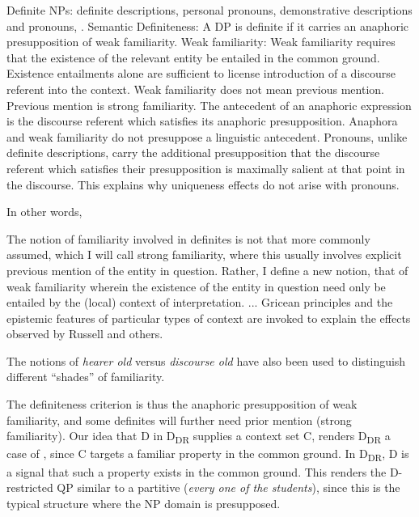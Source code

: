\documentclass[output=paper,
modfonts
]{langscibook}
\begin{document}
\ea\label{ex:etxeberria:23}
	\ea
		{ Definite NPs:} definite descriptions, personal pronouns, demonstrative descriptions and pronouns, .
	\ex
		{Semantic Definiteness:} A DP is definite if it carries an anaphoric presupposition of weak familiarity.
	\ex
		{Weak familiarity:}  Weak familiarity requires that the existence of the relevant entity be entailed in the common ground.  Existence entailments alone are sufficient to license introduction of a discourse referent into the context. Weak familiarity does not mean previous mention. Previous mention is strong familiarity.
	\ex
		The antecedent of an anaphoric expression is the discourse referent which satisfies its anaphoric presupposition.
	\ex
		Anaphora and weak familiarity do not presuppose a linguistic antecedent.
	\ex
		Pronouns, unlike definite descriptions, carry the additional presupposition that the discourse referent which satisfies their presupposition is maximally salient at that point in the discourse. This  explains why uniqueness effects do not arise with pronouns.
	\z
\z

In other words, 

\begin{displayquote}
The notion of familiarity involved {\ob}in definites{\cb} is not that more commonly assumed, which I will call strong familiarity, where this usually involves explicit previous mention of the entity in question. Rather, I define a new notion, that of weak familiarity wherein the existence of the entity in question need only be entailed by the (local) context of interpretation. {\ob}...{\cb} Gricean principles and the epistemic features of particular types of context are invoked to explain the  effects observed by Russell and others. \citep[288]{Roberts2003}
\end{displayquote}

The notions of \textit{hearer old} versus \textit{discourse old} have also been used \citep{Prince1981,WardBirner1995} to distinguish different ``shades'' of familiarity.

The definiteness criterion is thus the anaphoric presupposition of weak familiarity, and some definites will further need prior mention (strong familiarity).  Our idea that D in D\textsubscript{DR} supplies a context set C, renders D\textsubscript{DR} a case of , since C targets a familiar property in the common ground. In D\textsubscript{DR}, D is a signal that such a property exists in the common ground. This renders the D-restricted QP similar to a partitive (\textit{every one of the students}), since this is the typical structure where the NP domain is presupposed. 
\end{document}

